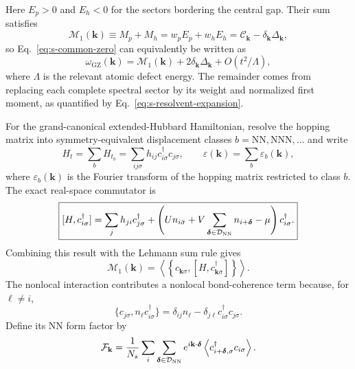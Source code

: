 \documentclass[10pt]{article}
\newcommand{\wzero}{\omega_{\mathrm{GZ}}}
\newcommand{\dk}{\delta_{\mathbf{k}}}
\newcommand{\centermom}{\mathcal C_{\mathbf{k}}}
\newcommand{\sep}{\Delta_{\mathbf{k}}}
\begin{document}
Here $E_p>0$ and $E_h<0$ for the sectors bordering the central gap. Their sum satisfies
\begin{equation}
 \mathcal M_1(\mathbf k)\equiv M_p+M_h
 =w_pE_p+w_hE_h
 =\centermom-\dk\sep ,
 \label{eq:s-uv-m1-center}
\end{equation}
so Eq.~\ref{eq:s-common-zero} can equivalently be written as
\begin{equation}
 \boxed{\wzero(\mathbf k)
 =\mathcal M_1(\mathbf k)+2\dk\sep+O(t^2/\Lambda),}
 \label{eq:s-uv-root-m1}
\end{equation}
where $\Lambda$ is the relevant atomic defect energy. The remainder comes from replacing each complete spectral sector by its weight and normalized first moment, as quantified by Eq.~\ref{eq:s-resolvent-expansion}.

For the grand-canonical extended-Hubbard Hamiltonian, resolve the hopping matrix into symmetry-equivalent displacement classes $b=\mathrm{NN},\mathrm{NNN},\ldots$ and write
\[
H_t=\sum_b H_{t_b}=\sum_{ij\sigma}h_{ij}c^\dagger_{i\sigma}c_{j\sigma},
\qquad
\varepsilon(\mathbf k)=\sum_b\varepsilon_b(\mathbf k),
\]
where $\varepsilon_b(\mathbf k)$ is the Fourier transform of the hopping matrix restricted to class $b$. The exact real-space commutator is
\begin{equation}
 \boxed{
 [H,c^\dagger_{i\sigma}]
 =\sum_j h_{ji}c^\dagger_{j\sigma}
 +\left(U n_{i\bar\sigma}
 +V\sum_{\boldsymbol\delta\in\mathcal D_{\rm NN}}
 n_{i+\boldsymbol\delta}-\mu\right)c^\dagger_{i\sigma}.}
 \label{eq:s-extended-hubbard-commutator}
\end{equation}
Combining this result with the Lehmann sum rule gives
\begin{equation}
 \mathcal M_1(\mathbf k)
 =\left\langle
 \left\{c_{\mathbf k\sigma},
 [H,c^\dagger_{\mathbf k\sigma}]\right\}
 \right\rangle .
 \label{eq:s-uv-m1-commutator}
\end{equation}
The nonlocal interaction contributes a nonlocal bond-coherence term because, for $\ell\ne i$,
\begin{equation}
 \{c_{j\sigma},n_\ell c^\dagger_{i\sigma}\}
 =\delta_{ij}n_\ell-\delta_{j\ell}
 c^\dagger_{i\sigma}c_{j\sigma}.
 \label{eq:s-v-anticommutator}
\end{equation}
Define its NN form factor by
\begin{equation}
 \mathcal F_{\mathbf k}
 =\frac1{N_s}\sum_i
 \sum_{\boldsymbol\delta\in\mathcal D_{\rm NN}}
 e^{i\mathbf k\cdot\boldsymbol\delta}
 \left\langle
 c^\dagger_{i+\boldsymbol\delta,\sigma}c_{i\sigma}
 \right\rangle .
 \label{eq:s-uv-coherence-form-factor}
\end{equation}
\end{document}
